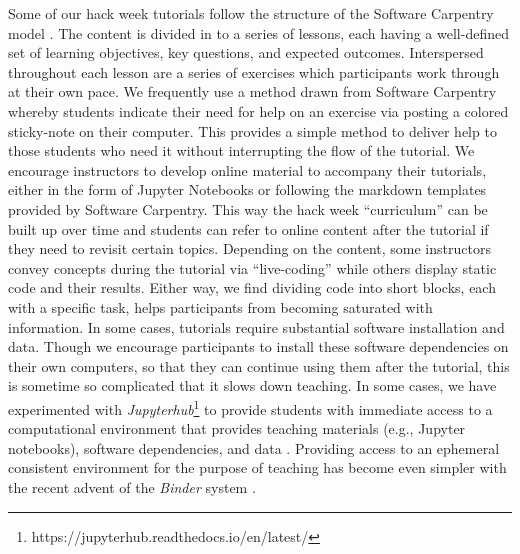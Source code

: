 \documentclass{aastex62}
\begin{document}
Some of our hack week tutorials follow the structure of the Software Carpentry model \cite{b:wilson-swc-lessons-2016}. The content is divided in to a series of lessons, each having a well-defined set of learning objectives, key questions, and expected outcomes. Interspersed throughout each lesson are a series of exercises which participants work through at their own pace. We frequently use a method drawn from Software Carpentry whereby students indicate their need for help on an exercise via posting a colored sticky-note on their computer. This provides a simple method to deliver help to those students who need it without interrupting the flow of the tutorial. We encourage instructors to develop online material to accompany their tutorials, either in the form of Jupyter Notebooks \cite{kluyver2016jupyter} or following the markdown templates provided by Software Carpentry. This way the hack week ``curriculum'' can be built up over time and students can refer to online content after the tutorial if they need to revisit certain topics. Depending on the content, some instructors convey concepts during the tutorial via ``live-coding'' while others display static code and their results. Either way, we find dividing code into short blocks, each with a specific task, helps participants from becoming saturated with information.
In some cases, tutorials require substantial software installation and data. Though we encourage participants to install these software dependencies on their own computers, so that they can continue using them after the tutorial, this is sometime so complicated that it slows down teaching. In some cases, we have experimented with \emph{Jupyterhub}\footnote{https://jupyterhub.readthedocs.io/en/latest/} to provide students with immediate access to a computational environment that provides teaching materials (e.g., Jupyter notebooks), software dependencies, and data \cite{holdgraf2017portable}. Providing access to an ephemeral consistent environment for the purpose of teaching has become even simpler with the recent advent of the \emph{Binder} system \cite{Holdgraf2017-pd, Titus_Brown_undated-pc}.
\end{document}
